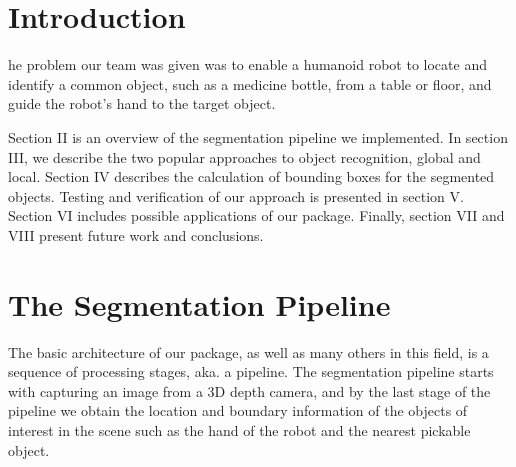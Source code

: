 \documentclass[journal]{IEEEtran}
\begin{document}
\section{Introduction}
% 
% 
% 
% 
he problem our team was given was to enable a humanoid robot to locate and identify a common object, such as a medicine bottle, from a table or floor, and guide the robot's hand to the target object.

Section II is an overview of the segmentation pipeline we implemented.  In section III, we describe the two popular approaches to object recognition, global and local.  Section IV describes the calculation of bounding boxes for the segmented objects.  Testing and verification of our approach is presented in section V.  Section VI includes possible applications of our package.  Finally, section VII and VIII present future work and conclusions.  


\section{The Segmentation Pipeline}
The basic architecture of our package, as well as many others in this field, is a sequence of processing stages, aka. a pipeline. The segmentation pipeline starts with capturing an image from a 3D depth camera, and by the last stage of the pipeline we obtain the location and boundary information of the objects of interest in the scene such as the hand of the robot and the nearest pickable object.
\end{document}
